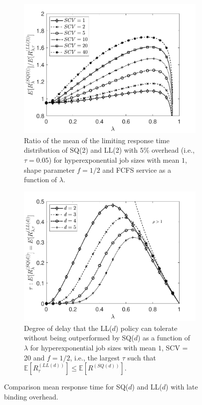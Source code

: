 \documentclass[12pt]{report}
\newcommand{\E}{\mathbb{E}}
\begin{document}
\begin{figure}[t]
\begin{center}
\begin{subfigure}{0.45\textwidth}
\centering
\captionsetup{width=.8\linewidth}
\includegraphics[width=1\linewidth]{figures/Chapter2/fig3_5a.pdf}
\caption{Ratio of the mean of the limiting response time distribution of SQ(2) and LL(2)
with $5\%$ overhead (i.e., $\tau = 0.05$) for hyperexponential
job sizes with mean $1$, shape parameter $f=1/2$ and FCFS service as a function of $\lambda$.}
\label{fig:LLDvsSQDhighSCVd2tau005}
\end{subfigure}
\begin{subfigure}{.45\textwidth}
\centering
\includegraphics[width=0.9\linewidth]{figures/Chapter2/fig3_5b.pdf}
\caption{Degree of delay that the LL($d$) policy can tolerate without being outperformed by SQ($d$)
as a function of $\lambda$ for hyperexponential job sizes with mean $1$, SCV = 20 and $f=1/2$, i.e., 
the largest $\tau$ such that $\E[R_{\tau}^{(LL(d))}] \leq \E[R^{(SQ(d))}]$.}
\label{fig:LLDvsSQD_tau_SCV20}
\end{subfigure}
\caption{Comparison mean response time for SQ($d$) and LL($d$) with late binding overhead.}
\label{fig:comapre_SQd_LLd_lateBind}
\end{center}
\end{figure}
\end{document}
